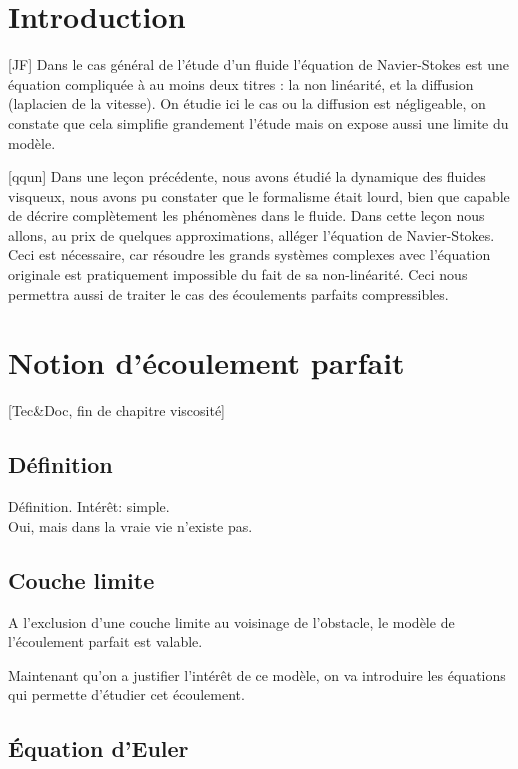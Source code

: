 \documentclass[11pt]{report}
\numberwithin{figure}{section}
\numberwithin{equation}{section}
\numberwithin{table}{section}
\newcommand{\1}{\boldsymbol{1}}
\begin{document}
\section*{Introduction}
  
[JF] Dans le cas général de l'étude d'un fluide l'équation de Navier-Stokes est une équation compliquée à au moins
deux titres : la non linéarité, et la diffusion (laplacien de la vitesse). On étudie ici le cas ou la diffusion est négligeable,
on constate que cela simplifie grandement l'étude mais on expose aussi une limite du modèle.


[qqun] Dans une leçon précédente, nous avons étudié la dynamique des fluides visqueux, nous avons pu constater que le formalisme était lourd, bien que capable de décrire complètement les phénomènes dans le fluide. Dans cette leçon nous allons, au prix de quelques approximations, alléger l'équation de Navier-Stokes. Ceci est nécessaire, car résoudre les grands systèmes complexes avec l'équation originale est pratiquement impossible du fait de sa non-linéarité. Ceci
nous permettra aussi de traiter le cas des écoulements parfaits compressibles.

\section{Notion d'écoulement parfait}

[Tec\&Doc, fin de chapitre viscosité]

\subsection{Définition}

Définition. Intérêt: simple. \\

\textcolor{mycolor5}{Oui, mais dans la vraie vie n'existe pas.}

\subsection{Couche limite}

A l'exclusion d'une couche limite au voisinage de l'obstacle, le modèle de l'écoulement parfait est valable.

\textcolor{mycolor5}{Maintenant qu'on a justifier l'intérêt de ce modèle, on va introduire les équations qui permette d'étudier cet écoulement.}


\subsection{Équation d'Euler}
\end{document}
